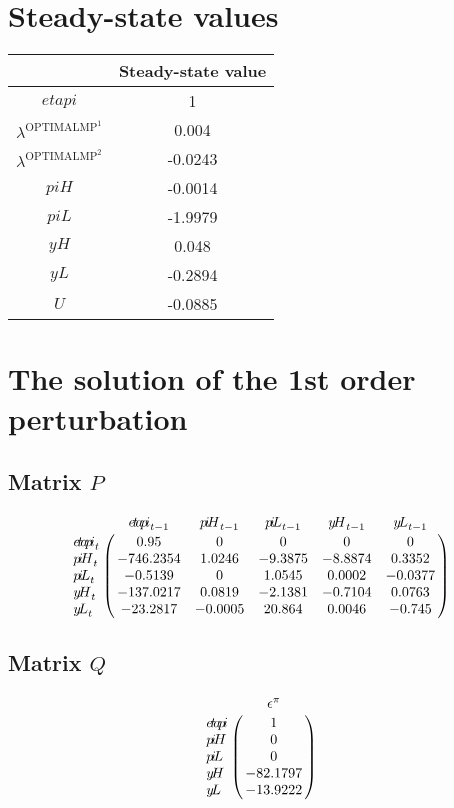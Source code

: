 

\section{Steady-state values}


\begin{tabular}{c|c|}
  & Steady-state value\\
\hline
${e\!t\!a\!p\!i}$ & 1 \\
$\lambda^{\mathrm{OPTIMALMP}^{\mathrm{1}}}$ & 0.004 \\
$\lambda^{\mathrm{OPTIMALMP}^{\mathrm{2}}}$ & -0.0243 \\
${p\!i\!H}$ & -0.0014 \\
${p\!i\!L}$ & -1.9979 \\
${y\!H}$ & 0.048 \\
${y\!L}$ & -0.2894 \\
$U$ & -0.0885 \\
\hline
\end{tabular}


\section{The solution of the 1st order perturbation}

\subsection*{Matrix $P$}

$$\bordermatrix{
~ & {e\!t\!a\!p\!i}_{t-1} & {p\!i\!H}_{t-1} & {p\!i\!L}_{t-1} & {y\!H}_{t-1} & {y\!L}_{t-1} \cr
{e\!t\!a\!p\!i}_{t} & 0.95 & 0 & 0 & 0 & 0 \cr
{p\!i\!H}_{t} & -746.2354 & 1.0246 & -9.3875 & -8.8874 & 0.3352 \cr
{p\!i\!L}_{t} & -0.5139 & 0 & 1.0545 & 0.0002 & -0.0377 \cr
{y\!H}_{t} & -137.0217 & 0.0819 & -2.1381 & -0.7104 & 0.0763 \cr
{y\!L}_{t} & -23.2817 & -0.0005 & 20.864 & 0.0046 & -0.745 \cr
}$$

\subsection*{Matrix $Q$}

$$\bordermatrix{
~ & \epsilon^{\pi} \cr
{e\!t\!a\!p\!i} & 1 \cr
{p\!i\!H} & 0 \cr
{p\!i\!L} & 0 \cr
{y\!H} & -82.1797 \cr
{y\!L} & -13.9222 \cr
}$$

